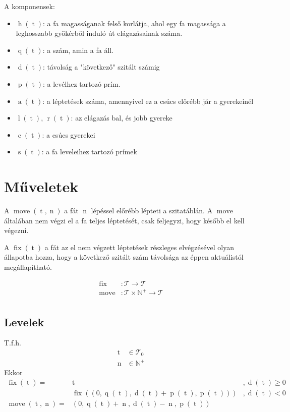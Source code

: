\documentclass{article}
\newcommand*{\NaturalsP}{\ensuremath{\mathbb{N}^+}}
\newcommand*{\Trees}{\ensuremath{\mathcal{T}}}
\newcommand*{\fFix}{\ensuremath{\operatorname{fix}}}
\newcommand*{\fMove}{\ensuremath{\operatorname{move}}}
\newcommand*{\sAccumulated}[1]{\ensuremath{\operatorname{a}\left(#1\right)}}
\newcommand*{\sChildren}[1]{\ensuremath{\operatorname{c}\left(#1\right)}}
\newcommand*{\sDiff}[1]{\ensuremath{\operatorname{d}\left(#1\right)}}
\newcommand*{\sHeight}[1]{\ensuremath{\operatorname{h}\left(#1\right)}}
\newcommand*{\sLeft}[1]{\ensuremath{\operatorname{l}\left(#1\right)}}
\newcommand*{\sPosition}[1]{\ensuremath{\operatorname{q}\left(#1\right)}}
\newcommand*{\sPrime}[1]{\ensuremath{\operatorname{p}\left(#1\right)}}
\newcommand*{\sPrimes}[1]{\ensuremath{\operatorname{s}\left(#1\right)}}
\newcommand*{\sRight}[1]{\ensuremath{\operatorname{r}\left(#1\right)}}
\newcommand*{\vN}{\ensuremath{\operatorname{n}}}
\newcommand*{\vT}{\ensuremath{\operatorname{t}}}
\begin{document}
A komponensek:
\begin{itemize}
\item \sHeight{\vT}: a fa magasságanak felső korlátja,
	ahol egy fa magassága a leghosszabb gyökérből induló út elágazásainak száma.
\item \sPosition{\vT}: a szám, amin a fa áll.
\item \sDiff{\vT}: távolság a "következő" szitált számig
\item \sPrime{\vT}: a levélhez tartozó prím.
\item \sAccumulated{\vT}: a léptetések száma, amennyivel ez a csúcs előrébb jár a gyerekeinél
\item \sLeft{\vT}, \sRight{\vT}: az elágazás bal, és jobb gyereke
\item \sChildren{\vT}: a csúcs gyerekei
\item \sPrimes{\vT}: a fa leveleihez tartozó prímek
\end{itemize}

\section{Műveletek}

A $\fMove(\vT, \vN)$ a fát $\vN$ lépéssel előrébb lépteti a szitatáblán.
A $\fMove$ általában nem végzi el a fa teljes léptetését, csak feljegyzi, hogy később el kell végezni.

A $\fFix(\vT)$ a fát az el nem végzett léptetések részleges elvégzésével olyan állapotba hozza,
hogy a következő szitált szám távolsága az éppen aktuálistól megállapítható.

\begin{align*}
\fFix &: \Trees \rightarrow \Trees \\
\fMove &: \Trees \times \NaturalsP \rightarrow \Trees \\
\end{align*}

\subsection{Levelek}

T.f.h.
\begin{align*}
\vT &\in \Trees_0 \\
\vN &\in \NaturalsP
\end{align*}
Ekkor
\begin{align*}
\fFix(\vT) =& \vT &, \sDiff{\vT} \ge 0 \\
	& \fFix((0, \sPosition{\vT}, \sDiff{\vT} + \sPrime{\vT}, \sPrime{\vT}))
	&, \sDiff{\vT} < 0 \\
\fMove(\vT, \vN)
	=& (0, \sPosition{\vT} + \vN, \sDiff{\vT} - \vN, \sPrime{\vT})& \\
\end{align*}
\end{document}
